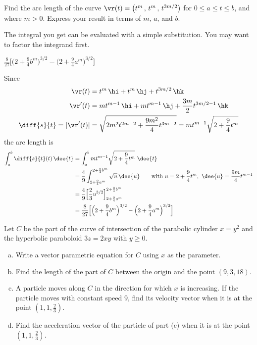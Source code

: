 \begin{question}[M317 2011A] %
Find the arc length of the curve 
$\vr(t) = \big(t^m\,,\, t^m\,,\, t^{3m/2}\big)$ for $0 \le a \le t \le b$, 
and where $m > 0$.
Express your result in terms of $m$, $a$, and $b$. 
\end{question}

\begin{hint} 
The integral you get can be evaluated with
a simple substitution. You may want to factor the integrand first.
\end{hint}

\begin{answer} 
$\frac{8}{27}\Big[\Big(2 + \frac{9}{4}b^m\Big)^{3/2}
                   -\Big(2 + \frac{9}{4}a^m\Big)^{3/2}\Big]$
\end{answer}

\begin{solution} 
Since
\begin{align*}
\vr(t) & = t^m\,\hi + t^m\,\hj + t^{3m/2}\,\hk \\
\vr'(t) &= mt^{m-1}\,\hi + mt^{m-1}\,\hj +\frac{3m}{2}t^{3m/2-1}\,\hk \\
\diff{s}{t} = |\vr'(t)| & = \sqrt{ 2m^2 t^{2m-2} +\frac{9m^2}{4} t^{3m-2} } 
= mt^{m-1}\sqrt{2 + \frac{9}{4}t^m }
\end{align*}
the arc length is
\begin{align*}
\int_a^b \diff{s}{t}(t)\,\dee{t}
&=\int_a^b mt^{m-1}\sqrt{2 + \frac{9}{4}t^m }\ \dee{t} \\
&=\frac{4}{9}\int_{2 + \frac{9}{4}a^m}^{2 + \frac{9}{4}b^m}\sqrt{u}\,\dee{u}
\qquad\text{with } u = 2 + \frac{9}{4}t^m,\ \dee{u} = \frac{9m}{4}t^{m-1}\\
&=\frac{4}{9}\Big[\frac{2}{3}u^{3/2}\Big]_{2 + \frac{9}{4}a^m}
                                         ^{2 + \frac{9}{4}b^m} \\
&=\frac{8}{27}\Big[\Big(2 + \frac{9}{4}b^m\Big)^{3/2}
                   -\Big(2 + \frac{9}{4}a^m\Big)^{3/2}\Big]
\end{align*} 
\end{solution}


\begin{question}
 Let $C$ be the part of the curve of intersection of the 
parabolic cylinder $x = y^2$ and the hyperbolic  paraboloid $3z = 2xy$
with $y\ge 0$.
\begin{enumerate}[(a)] 
\item
   Write a vector parametric equation for $C$ using $x$ as the parameter. 
\item 
   Find the length of the part of $C$ between the origin and 
   the point $(9, 3, 18)$. 
\item
   A particle moves along $C$ in the direction for which $x$ is 
   increasing.  If the particle  moves with constant speed 9, find 
   its velocity vector when it is at  the point $(1, 1, \frac{2}{3})$. 
\item
   Find the acceleration vector of the particle of part (c) 
   when it is at  the point $(1, 1, \frac{2}{3})$. 
\end{enumerate}
\end{question}

